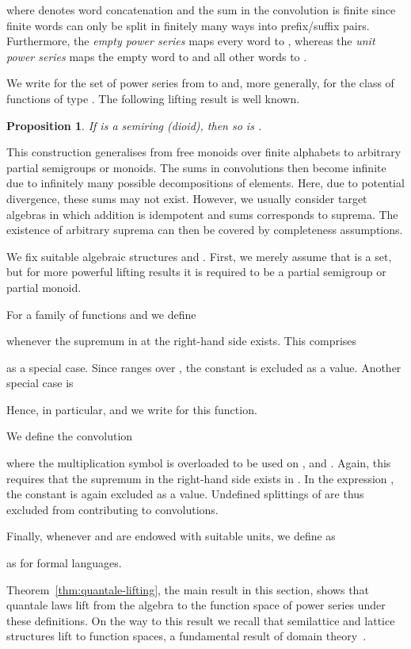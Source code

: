 \documentclass[12pt]{article}
\newtheorem{proposition}{Proposition}
\theoremstyle{definition}
\begin{document}
where  denotes word concatenation and the sum in the convolution
is finite since finite words can only be split in finitely many ways
into prefix/suffix pairs. Furthermore, the \emph{empty power series}
 maps every word to , whereas the \emph{unit power series}
 maps the empty word to  and all other words to .

We write  for the set of power series from  to
 and, more generally,  for the class of functions of type
. The following lifting result is well known.
\begin{proposition}\label{prop:fpslifting}
  If  is a semiring (dioid), then so is
  .
\end{proposition}

This construction generalises from free monoids over finite alphabets
to arbitrary partial semigroups or monoids.  The sums in convolutions
then become infinite due to infinitely many possible decompositions of
elements. Here, due to potential divergence, these sums may not
exist. However, we usually consider target algebras in which addition
is idempotent and sums corresponds to suprema. The existence of
arbitrary suprema can then be covered by completeness assumptions.

We fix suitable algebraic structures  and .  First, we merely
assume that  is a set, but for more powerful lifting results it is
required to be a partial semigroup or partial monoid.

For a family of functions 
and  we define

whenever the supremum in  at the right-hand side exists. This
comprises 

as a special case.  Since  ranges over , the constant  is
excluded as a value.  Another special case is

Hence, in particular,  and we
write  for this function.

We define the convolution

where the multiplication symbol is overloaded to be used on , 
and . Again, this requires that the supremum in the right-hand
side exists in .  In the expression , the constant
 is again excluded as a value. Undefined splittings of  are
thus excluded from contributing to convolutions.

Finally, whenever  and  are endowed with suitable units, we
define  as

as for formal languages. 


Theorem~\ref{thm:quantale-lifting}, the main result in this section,
shows that quantale laws lift from the algebra  to the function
space  of power series under these definitions. On the way to
this result we recall that semilattice and lattice structures lift to
function spaces, a fundamental result of domain
theory~\cite{AbramskyJung}.
\end{document}
